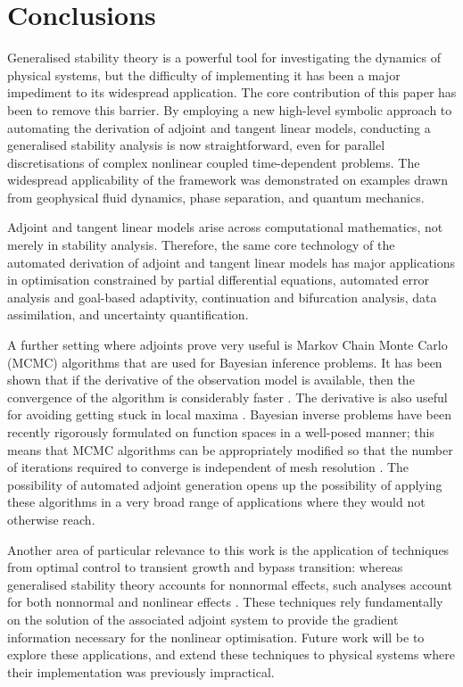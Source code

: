 \documentclass{siamltex}
\begin{document}
\section{Conclusions}
Generalised stability theory is a powerful tool for investigating the dynamics of physical systems, but the
difficulty of implementing it has been a major impediment to its widespread application. The core contribution
of this paper has been to remove this barrier. By employing a new high-level symbolic approach to automating
the derivation of adjoint and tangent linear models, conducting a generalised stability analysis is now
straightforward, even for parallel discretisations of complex nonlinear coupled time-dependent problems. The widespread
applicability of the framework was demonstrated on examples drawn from geophysical fluid dynamics, phase
separation, and quantum mechanics.

Adjoint and tangent linear models arise across computational mathematics, not merely in stability
analysis. Therefore, the same core technology of the automated derivation of adjoint and tangent
linear models has major applications in optimisation constrained by partial differential equations,
automated error analysis and goal-based adaptivity, continuation and bifurcation analysis, data
assimilation, and uncertainty quantification.

A further setting where adjoints prove very useful is Markov Chain Monte Carlo (MCMC) algorithms that
are used for Bayesian inference problems.  It has been shown that if the derivative of the
observation model is available, then the convergence of the algorithm is considerably faster
\cite{roberts1996,martin2012}. The derivative is also useful for avoiding getting stuck in local maxima
\cite{beskos2011}. Bayesian inverse problems have been recently rigorously formulated on function
spaces in a well-posed manner; this means that MCMC algorithms can be appropriately modified so that
the number of iterations required to converge is independent of mesh resolution \cite{cotter2010}.
The possibility of automated adjoint generation opens up the possibility of applying these
algorithms in a very broad range of applications where they would not otherwise reach.

Another area of particular relevance to this work is the application of techniques from optimal
control to transient growth and bypass transition: whereas generalised stability theory accounts
for nonnormal effects, such analyses account for both nonnormal and nonlinear effects
\cite{monokrousos2011,juniper2011b,juniper2011a}.  These techniques rely fundamentally on the
solution of the associated adjoint system to provide the gradient information necessary for the
nonlinear optimisation.  Future work will be to explore these applications, and extend these
techniques to physical systems where their implementation was previously impractical.
\end{document}
